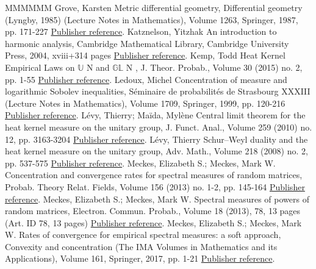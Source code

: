 \documentclass[11pt]{article}
\theoremstyle{definition}
\numberwithin{equation}{section}
\numberwithin{figure}{section}
\numberwithin{table}{section}
\begin{document}
\begin{thebibliography}{MMMMMM}
 Grove, Karsten Metric differential geometry, Differential geometry (Lyngby, 1985) (Lecture Notes in Mathematics), Volume 1263, Springer, 1987, pp. 171-227 \href{https://ahl.centre-mersenne.org/item/AHL_2018__1__247_0/#Grove1987}{Publisher reference}.
 Katznelson, Yitzhak An introduction to harmonic analysis, Cambridge Mathematical Library, Cambridge University Press, 2004, xviii+314 pages \href{https://ahl.centre-mersenne.org/item/AHL_2018__1__247_0/#Katznelson2004}{Publisher reference}.
 Kemp, Todd Heat Kernel Empirical Laws on \(\mathbb{U}\) N  and \(\mathbb{G}\)\(\mathbb{L}\) N , J. Theor. Probab., Volume 30 (2015) no. 2, pp. 1-55 \href{https://ahl.centre-mersenne.org/item/AHL_2018__1__247_0/#Kemp2015}{Publisher reference}.
 Ledoux, Michel Concentration of measure and logarithmic Sobolev inequalities, Séminaire de probabilités de Strasbourg XXXIII (Lecture Notes in Mathematics), Volume 1709, Springer, 1999, pp. 120-216 \href{https://ahl.centre-mersenne.org/item/AHL_2018__1__247_0/#Ledoux1999}{Publisher reference}.
 Lévy, Thierry; Maïda, Mylène Central limit theorem for the heat kernel measure on the unitary group, J. Funct. Anal., Volume 259 (2010) no. 12, pp. 3163-3204 \href{https://ahl.centre-mersenne.org/item/AHL_2018__1__247_0/#LevyMaida2010}{Publisher reference}.
 Lévy, Thierry Schur–Weyl duality and the heat kernel measure on the unitary group, Adv. Math., Volume 218 (2008) no. 2, pp. 537-575 \href{https://ahl.centre-mersenne.org/item/AHL_2018__1__247_0/#Levy2008}{Publisher reference}.
 Meckes, Elizabeth S.; Meckes, Mark W. Concentration and convergence rates for spectral measures of random matrices, Probab. Theory Relat. Fields, Volume 156 (2013) no. 1-2, pp. 145-164 \href{https://ahl.centre-mersenne.org/item/AHL_2018__1__247_0/#MM-PTRF-2013}{Publisher reference}.
 Meckes, Elizabeth S.; Meckes, Mark W. Spectral measures of powers of random matrices, Electron. Commun. Probab., Volume 18 (2013), 78, 13 pages (Art. ID 78, 13 pages) \href{https://ahl.centre-mersenne.org/item/AHL_2018__1__247_0/#MM-ECP-2013}{Publisher reference}.
 Meckes, Elizabeth S.; Meckes, Mark W. Rates of convergence for empirical spectral measures: a soft approach, Convexity and concentration (The IMA Volumes in Mathematics and its Applications), Volume 161, Springer, 2017, pp. 1-21 \href{https://ahl.centre-mersenne.org/item/AHL_2018__1__247_0/#MM2016}{Publisher reference}.

\end{thebibliography}
\end{document}
